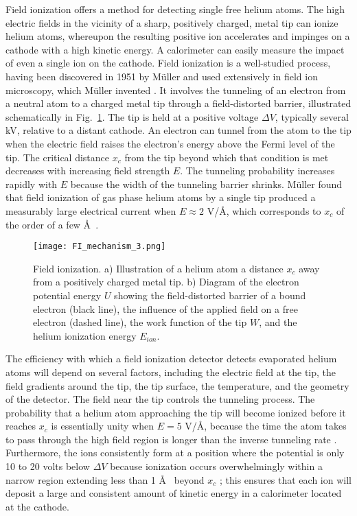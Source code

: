 \documentclass[10pt, letterpaper, reprint, superscriptaddress, aps, prl]
{revtex4-1} \usepackage[latin1]{inputenc}
\begin{document}
Field ionization offers a method for detecting single free helium atoms. 
The high electric fields in the vicinity of a sharp, positively charged, metal tip can ionize helium atoms, whereupon the resulting positive ion accelerates and impinges on a cathode with a high kinetic energy. 
A calorimeter can easily measure the impact of even a single ion on the cathode. 
Field ionization is a well-studied process, having been discovered in 1951 by M{\"u}ller \cite{Muller1951} and used extensively in field ion microscopy, which M{\"u}ller invented \cite{Muller1951,Muller1956,Gomer1994}.
It involves the tunneling of an electron from a neutral atom to a charged metal tip through a field-distorted barrier, illustrated schematically in Fig.~\ref{fig:FImechanism}.
The tip is held at a positive voltage $\Delta V$, typically several kV, relative to a distant cathode.
An electron can tunnel from the atom to the tip when the electric field raises the electron's energy above the Fermi level of the tip. 
The critical distance $x_c$ from the tip beyond which that condition is met decreases with increasing field strength $E$.
The tunneling probability increases rapidly with $E$ because the width of the tunneling barrier shrinks. 
M{\"u}ller found that field ionization of gas phase helium atoms by a single tip produced a measurably large electrical current when $E\approx 2$ V/\AA, which corresponds to $x_c$ of the order of a few \AA ~\cite{Muller1956}.

\begin{figure}[!h]
\centering\texttt{[image: FI\_mechanism\_3.png]}
\caption{Field ionization. a) Illustration of a helium atom a distance $x_c$ away from a positively charged metal tip. b) Diagram of the electron potential energy $U$ showing the field-distorted barrier of a bound electron (black line), the influence of the applied field on a free electron (dashed line), the work function of the tip $W$, and the helium ionization energy $E_{ion}$.} 
\label{fig:FImechanism}
\end{figure}
 
The efficiency with which a field ionization detector detects evaporated helium atoms will depend on several factors, including the electric field at the tip, the field gradients around the tip, the tip surface, the temperature, and the geometry of the detector. 
The field near the tip controls the tunneling process. 
The probability that a helium atom approaching the tip will become ionized before it reaches $x_c$ is essentially unity when $E=5$ V/\AA, because the time the atom takes to pass through the high field region is longer than the inverse tunneling rate \cite{ODonnell2010}. 
Furthermore, the ions consistently form at a position where the potential is only 10 to 20 volts below $\Delta V$ because ionization occurs overwhelmingly within a narrow region extending less than 1 \AA~ beyond $x_c$ \cite{Muller1956,ODonnell2010}; this ensures that each ion will deposit a large and consistent amount of kinetic energy in a calorimeter located at the cathode.
\end{document}
